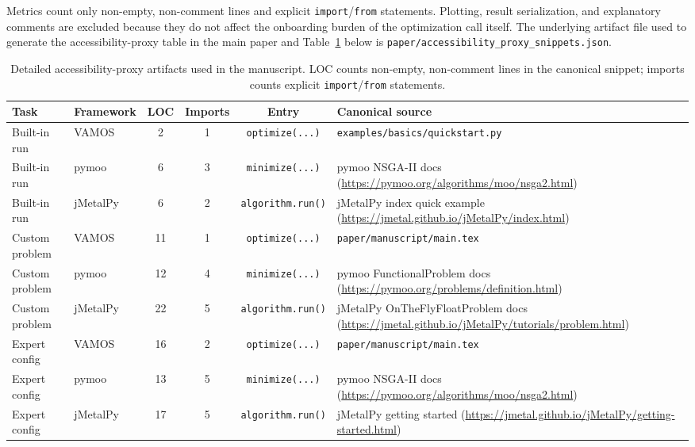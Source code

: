 \documentclass[journal]{IEEEtran}
\begin{document}
Metrics count only non-empty, non-comment lines and explicit \texttt{import}/\texttt{from} statements. Plotting, result serialization, and explanatory comments are excluded because they do not affect the onboarding burden of the optimization call itself. The underlying artifact file used to generate the accessibility-proxy table in the main paper and Table~\ref{tab:accessibility_proxy_details} below is \texttt{paper/accessibility\_proxy\_snippets.json}.

\begin{table}[htbp]
\centering
\scriptsize
\setlength{\tabcolsep}{4pt}
\caption{Detailed accessibility-proxy artifacts used in the manuscript. LOC counts non-empty, non-comment lines in the canonical snippet; imports counts explicit \texttt{import}/\texttt{from} statements.}
\label{tab:accessibility_proxy_details}
\begin{tabular}{@{}llcccp{}@{}}
\toprule
\textbf{Task} & \textbf{Framework} & \textbf{LOC} & \textbf{Imports} & \textbf{Entry} & \textbf{Canonical source} \\
\midrule
Built-in run & VAMOS & 2 & 1 & \texttt{optimize(...)} & \texttt{examples/basics/quickstart.py} \\
Built-in run & pymoo & 6 & 3 & \texttt{minimize(...)} & pymoo NSGA-II docs (\url{https://pymoo.org/algorithms/moo/nsga2.html}) \\
Built-in run & jMetalPy & 6 & 2 & \texttt{algorithm.run()} & jMetalPy index quick example (\url{https://jmetal.github.io/jMetalPy/index.html}) \\
\midrule
Custom problem & VAMOS & 11 & 1 & \texttt{optimize(...)} & \texttt{paper/manuscript/main.tex} \\
Custom problem & pymoo & 12 & 4 & \texttt{minimize(...)} & pymoo FunctionalProblem docs (\url{https://pymoo.org/problems/definition.html}) \\
Custom problem & jMetalPy & 22 & 5 & \texttt{algorithm.run()} & jMetalPy OnTheFlyFloatProblem docs (\url{https://jmetal.github.io/jMetalPy/tutorials/problem.html}) \\
\midrule
Expert config & VAMOS & 16 & 2 & \texttt{optimize(...)} & \texttt{paper/manuscript/main.tex} \\
Expert config & pymoo & 13 & 5 & \texttt{minimize(...)} & pymoo NSGA-II docs (\url{https://pymoo.org/algorithms/moo/nsga2.html}) \\
Expert config & jMetalPy & 17 & 5 & \texttt{algorithm.run()} & jMetalPy getting started (\url{https://jmetal.github.io/jMetalPy/getting-started.html}) \\
\bottomrule
\end{tabular}
\end{table}
\end{document}
